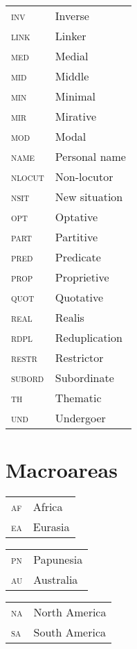 \begin{tabularx}{.45\textwidth}{lQ}
	\textsc{inv} & Inverse \\
	\textsc{link} & Linker \\
	\textsc{med} & Medial \\
	\textsc{mid} & Middle \\
	\textsc{min} & Minimal \\
	\textsc{mir} & Mirative \\
	\textsc{mod} & Modal \\
	\textsc{name} & Personal name \\
	\textsc{nlocut} & Non-locutor \\
	\textsc{nsit} & New situation \\
	\textsc{opt} & Optative \\
	\textsc{part} & Partitive \\
	\textsc{pred} & Predicate \\
	\textsc{prop} & Proprietive \\
	\textsc{quot} & Quotative \\
	\textsc{real} & Realis \\
	\textsc{rdpl} & Reduplication \\
	\textsc{restr} & Restrictor \\
	\textsc{subord} & Subordinate \\
	\textsc{th} & Thematic \\
	\textsc{und} & Undergoer \\
\end{tabularx}

\newpage

\section*{Macroareas}
\begin{tabularx}{.30\textwidth}{lQ}
	\textsc{af} & Africa \\
	\textsc{ea} & Eurasia \\
\end{tabularx}
\begin{tabularx}{.30\textwidth}{lQ}
	\textsc{pn} & Papunesia \\
	\textsc{au} & Australia \\
\end{tabularx}
\begin{tabularx}{.30\textwidth}{lQ}
	\textsc{na} & North America \\
	\textsc{sa} & South America \\
\end{tabularx}

